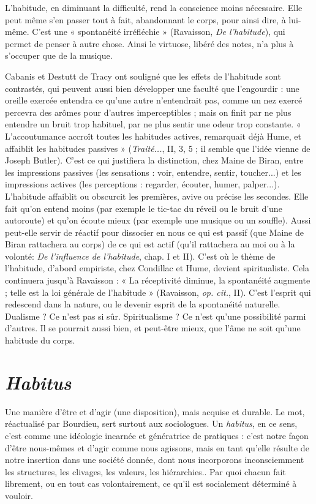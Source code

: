 L'habitude, en diminuant la difficulté, rend la conscience moins nécessaire.
Elle peut même s’en passer tout à fait, abandonnant le corps, pour ainsi dire, à
lui-même. C’est une « spontanéité irréfléchie » (Ravaisson, {\it De l'habitude}), qui
permet de penser à autre chose. Ainsi le virtuose, libéré des notes, n’a plus à
s’occuper que de la musique.

Cabanis et Destutt de Tracy ont souligné que les effets de l’habitude sont
contrastés, qui peuvent aussi bien développer une faculté que l’engourdir : une
oreille exercée entendra ce qu’une autre n’entendrait pas, comme un nez exercé
percevra des arômes pour d’autres imperceptibles ; mais on finit par ne plus
entendre un bruit trop habituel, par ne plus sentir une odeur trop constante.
« L’accoutumance accroît toutes les habitudes actives, remarquait déjà Hume,
et affaiblit les habitudes passives » ({\it Traité...}, II, 3, 5 ; il semble que l’idée
vienne de Joseph Butler). C’est ce qui justifiera la distinction, chez Maine de
Biran, entre les impressions passives (les sensations : voir, entendre, sentir, toucher...)
et les impressions actives (les perceptions : regarder, écouter, humer,
palper...). L'habitude affaiblit ou obscurcit les premières, avive ou précise les
secondes. Elle fait qu’on entend moins (par exemple le tic-tac du réveil ou le
bruit d’une autoroute) et qu’on écoute mieux (par exemple une musique ou un
souffle). Aussi peut-elle servir de réactif pour dissocier en nous ce qui est passif
(que Maine de Biran rattachera au corps) de ce qui est actif (qu’il rattachera au
moi ou à la volonté: {\it De l'influence de l'habitude}, chap. I et II). C’est où le
thème de l’habitude, d’abord empiriste, chez Condillac et Hume, devient spiritualiste.
Cela continuera jusqu’à Ravaisson : « La réceptivité diminue, la
spontanéité augmente ; telle est la loi générale de l'habitude » (Ravaisson,
{\it op. cit.}, II). C’est l’esprit qui redescend dans la nature, ou le devenir esprit de la
spontanéité naturelle. Dualisme ? Ce n’est pas si sûr. Spiritualisme ? Ce n’est
qu’une possibilité parmi d’autres. Il se pourrait aussi bien, et peut-être mieux,
que l’âme ne soit qu’une habitude du corps.

\section{{\it Habitus}}
Une manière d’être et d’agir (une disposition), mais acquise et
durable. Le mot, réactualisé par Bourdieu, sert surtout aux
sociologues. Un {\it habitus}, en ce sens, c’est comme une idéologie incarnée et
génératrice de pratiques : c’est notre façon d’être nous-mêmes et d’agir comme
nous agissons, mais en tant qu’elle résulte de notre insertion dans une société
donnée, dont nous incorporons inconsciemment les structures, les clivages, les
valeurs, les hiérarchies.. Par quoi chacun fait librement, ou en tout cas volontairement,
ce qu’il est socialement déterminé à vouloir.

